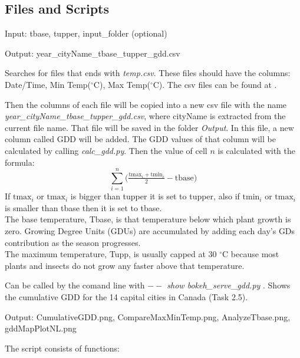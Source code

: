 \documentclass[12pt]{article}
\begin{document}
\subsection{Files and Scripts}
\begin{description}
\item[gdd.py]
\item Input: tbase, tupper, input\_folder (optional)
\item Output: year\_cityName\_tbase\_tupper\_gdd.csv
\item Searches for files that ends with \emph{temp.csv}. These
files should have the columns: Date/Time, Min Temp(${}^\circ$C), Max Temp(${}^\circ$C).
The csv files can be found at \cite{CityTemp}.

Then the columns of each file will be copied into a new csv file with the name
\emph{year\_cityName\_tbase\_tupper\_gdd.csv}, where cityName is extracted from the
current file name. That file will be saved in the folder \emph{Output}.
In this file, a new column called GDD will be added. The GDD values of that column 
will be calculated by calling \emph{calc\_gdd.py}.
Then the value of cell $n$ is calculated with the formula:
$$
\sum_{i=1}^n \big( \tfrac{\text{tmax}_i+\text{tmin}_i}{2}-\text{tbase}\big)
$$
If $\text{tmax}_i$ or $\text{tmax}_i$ is bigger than tupper it is set to tupper,
 also if $\text{tmin}_i$ or $\text{tmax}_i$ 
is  smaller than tbase then it is set to tbase.
\\The base temperature, Tbase, is that temperature below which plant growth is zero.
 Growing Degree Units (GDUs) are accumulated by adding each day's GDs contribution as the season progresses.
\\ The maximum temperature, Tupp, is usually capped at 30 ${}^\circ$C because most plants and 
insects do not grow any faster above that temperature.

\item[bokeh\_serve\_gdd.py]
\item Can be called by the comand line with \emph{$--$ show bokeh\_serve\_gdd.py} .
Shows the cumulative GDD for the 14 capital cities in Canada (Task 2.5).

\item[create\_plots.py]
\item Output: CumulativeGDD.png, CompareMaxMinTemp.png, AnalyzeTbase.png, gddMapPlotNL.png
\item The script consists of functions:


\end{description}
\end{document}
